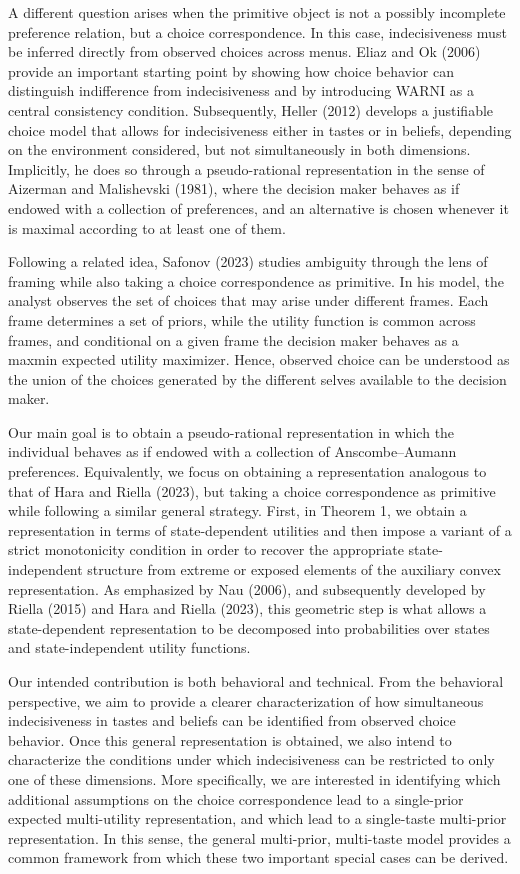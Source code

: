 \documentclass[11pt]{article}
\begin{document}
A different question arises when the primitive object is not a possibly incomplete preference relation, but a choice correspondence. In this case, indecisiveness must be inferred directly from observed choices across menus. Eliaz and Ok (2006) provide an important starting point by showing how choice behavior can distinguish indifference from indecisiveness and by introducing WARNI as a central consistency condition. Subsequently, Heller (2012) develops a justifiable choice model that allows for indecisiveness either in tastes or in beliefs, depending on the environment considered, but not simultaneously in both dimensions. Implicitly, he does so through a pseudo-rational representation in the sense of Aizerman and Malishevski (1981), where the decision maker behaves as if endowed with a collection of preferences, and an alternative is chosen whenever it is maximal according to at least one of them.

Following a related idea, Safonov (2023) studies ambiguity through the lens of framing while also taking a choice correspondence as primitive. In his model, the analyst observes the set of choices that may arise under different frames. Each frame determines a set of priors, while the utility function is common across frames, and conditional on a given frame the decision maker behaves as a maxmin expected utility maximizer. Hence, observed choice can be understood as the union of the choices generated by the different selves available to the decision maker.

Our main goal is to obtain a pseudo-rational representation in which the individual behaves as if endowed with a collection of Anscombe--Aumann preferences. Equivalently, we focus on obtaining a representation analogous to that of Hara and Riella (2023), but taking a choice correspondence as primitive while following a similar general strategy. First, in Theorem 1, we obtain a representation in terms of state-dependent utilities and then impose a variant of a strict monotonicity condition in order to recover the appropriate state-independent structure from extreme or exposed elements of the auxiliary convex representation. As emphasized by Nau (2006), and subsequently developed by Riella (2015) and Hara and Riella (2023), this geometric step is what allows a state-dependent representation to be decomposed into probabilities over states and state-independent utility functions.

Our intended contribution is both behavioral and technical. From the behavioral perspective, we aim to provide a clearer characterization of how simultaneous indecisiveness in tastes and beliefs can be identified from observed choice behavior. Once this general representation is obtained, we also intend to characterize the conditions under which indecisiveness can be restricted to only one of these dimensions. More specifically, we are interested in identifying which additional assumptions on the choice correspondence lead to a single-prior expected multi-utility representation, and which lead to a single-taste multi-prior representation. In this sense, the general multi-prior, multi-taste model provides a common framework from which these two important special cases can be derived.
\end{document}
